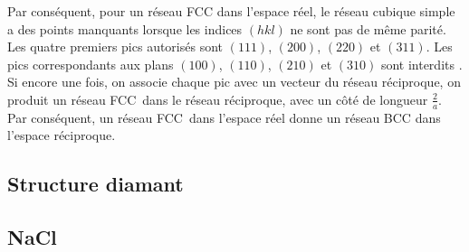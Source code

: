 Par conséquent, pour un réseau FCC dans l'espace réel, le réseau cubique simple a
des points manquants lorsque les indices $(hkl)$ ne sont pas de même parité. Les
quatre premiers pics autorisés sont $(111)$, $(200)$, $(220)$ et $(311)$. Les
pics correspondants aux plans $(100)$, $(110)$, $(210)$ et $(310)$ sont interdits
. Si encore une fois, on associe chaque pic avec un vecteur du réseau réciproque,
on produit un réseau FCC dans le réseau réciproque, avec un côté de longueur
$\frac{2}{a}$. Par conséquent, un réseau FCC dans l'espace réel donne un réseau
BCC dans l'espace réciproque.



\subsection{Structure diamant}
\subsection{NaCl}
